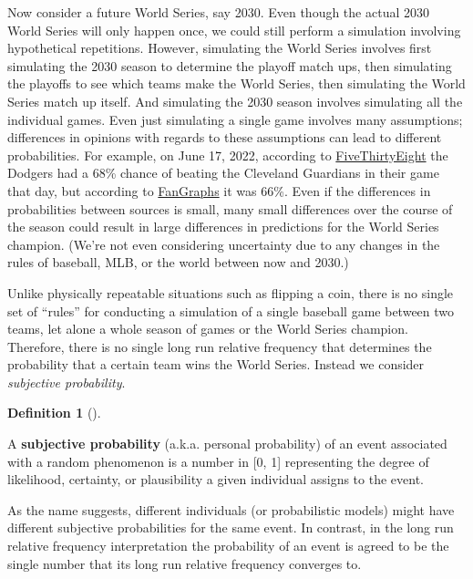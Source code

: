 \documentclass[
  letterpaper,
  DIV=11,
  numbers=noendperiod]{scrreprt}
\theoremstyle{plain}
\theoremstyle{definition}
\theoremstyle{definition}
\theoremstyle{definition}
\newtheorem{definition}{Definition}[chapter]
\theoremstyle{remark}
\begin{document}
Now consider a future World Series, say 2030. Even though the actual
2030 World Series will only happen once, we could still perform a
simulation involving hypothetical repetitions. However, simulating the
World Series involves first simulating the 2030 season to determine the
playoff match ups, then simulating the playoffs to see which teams make
the World Series, then simulating the World Series match up itself. And
simulating the 2030 season involves simulating all the individual games.
Even just simulating a single game involves many assumptions;
differences in opinions with regards to these assumptions can lead to
different probabilities. For example, on June 17, 2022, according to
\href{https://projects.fivethirtyeight.com/2022-mlb-predictions/dodgers/}{FiveThirtyEight}
the Dodgers had a 68\% chance of beating the Cleveland Guardians in
their game that day, but according to
\href{https://www.fangraphs.com/teams/dodgers/schedule}{FanGraphs} it
was 66\%. Even if the differences in probabilities between sources is
small, many small differences over the course of the season could result
in large differences in predictions for the World Series champion.
(We're not even considering uncertainty due to any changes in the rules
of baseball, MLB, or the world between now and 2030.)

Unlike physically repeatable situations such as flipping a coin, there
is no single set of ``rules'' for conducting a simulation of a single
baseball game between two teams, let alone a whole season of games or
the World Series champion. Therefore, there is no single long run
relative frequency that determines the probability that a certain team
wins the World Series. Instead we consider \emph{subjective
probability}.

\begin{definition}[]\protect\hypertarget{def-subjective-prob}{}\label{def-subjective-prob}

A \textbf{subjective
probability} (a.k.a.
personal probability) of an event associated with a random phenomenon is
a number in {[}0, 1{]} representing the degree of likelihood, certainty,
or plausibility a given individual assigns to the event.

\end{definition}

As the name suggests, different individuals (or probabilistic models)
might have different subjective probabilities for the same event. In
contrast, in the long run relative frequency interpretation the
probability of an event is agreed to be the single number that its long
run relative frequency converges to.
\end{document}
